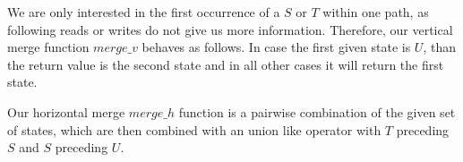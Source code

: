 We are only interested in the first occurrence of a $S$ or $T$ within one path, as following reads or writes do not give us more information. Therefore, our vertical 
merge function $merge\_v$ behaves as follows. In case the first given state is $U$, than the return value is the second state and in all other cases it will return the first state.
%


Our horizontal merge $merge\_h$ function is a pairwise combination of the given set of states, which are then combined with an union like operator with $T$ preceding $S$ and $S$ preceding $U$.
%
%

